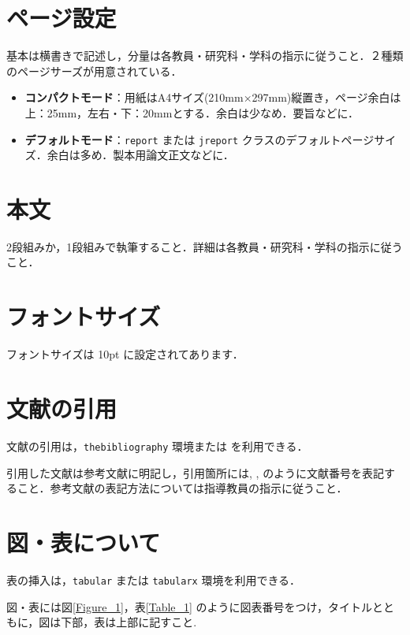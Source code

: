 \documentclass[a4paper,twocolumn]{report}
\begin{document}
\section{ページ設定}

基本は横書きで記述し，分量は各教員・研究科・学科の指示に従うこと．２種類のページサーズが用意されている．

\begin{itemize}
    \item \textbf{コンパクトモード}：用紙はA4サイズ(210mm×297mm)縦置き，ページ余白は上：25mm，左右・下：20mmとする．余白は少なめ．要旨などに．
    \item \textbf{デフォルトモード}：\lstinline{report} または \lstinline{jreport} クラスのデフォルトページサイズ．余白は多め．製本用論文正文などに．
\end{itemize}

\section{本文}

2段組みか，1段組みで執筆すること．詳細は各教員・研究科・学科の指示に従うこと．

\section{フォントサイズ}

フォントサイズは 10pt に設定されてあります．

\section{文献の引用}

文献の引用は，\lstinline{thebibliography} 環境または \BibTeX を利用できる．

引用した文献は参考文献に明記し，引用箇所には\cite{F}, \cite{H-K}, \cite{F,H-K,Z}のように文献番号を表記すること．参考文献の表記方法については指導教員の指示に従うこと．

\section{図・表について}

表の挿入は，\lstinline{tabular} または \lstinline{tabularx} 環境を利用できる．

図・表には図\ref{Figure_1}，表\ref{Table_1} のように図表番号をつけ，タイトルとともに，図は下部，表は上部に記すこと.
\end{document}
